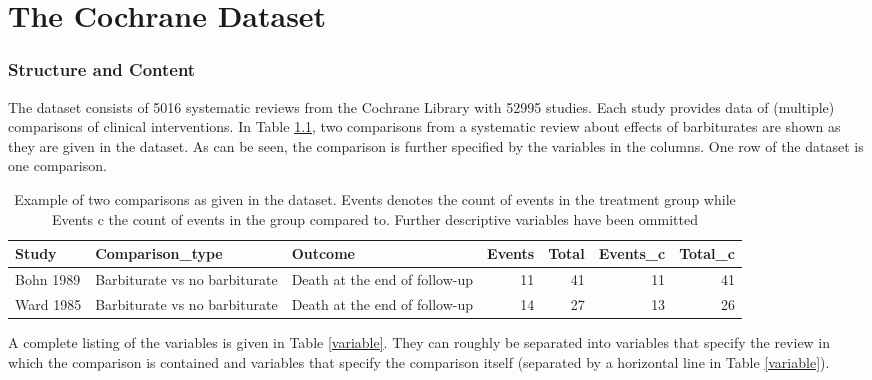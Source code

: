 \documentclass[11pt,a4paper,twoside]{book}\usepackage[]{graphicx}\usepackage[]{color}
\begin{document}













\chapter{The Cochrane Dataset} 

\subsection{Structure and Content}
The dataset consists of 5016 systematic reviews from the Cochrane Library with 52995 studies.
Each study provides data of (multiple) comparisons of clinical interventions. 
In Table \ref{barbiturate.row}, two comparisons from a systematic review about effects of barbiturates are shown as they are given in the dataset. As can be seen, the comparison is further specified by the variables in the columns. One row of the dataset is one comparison.

\begin{table}[ht]
\centering
\begingroup\scriptsize
\begin{tabular}{lllrrrr}
  \hline
Study & Comparison\_type & Outcome & Events & Total & Events\_c & Total\_c \\ 
  \hline
Bohn 1989 & Barbiturate vs no barbiturate & Death at the end of follow-up &  11 &  41 &  11 &  41 \\ 
  Ward 1985 & Barbiturate vs no barbiturate & Death at the end of follow-up &  14 &  27 &  13 &  26 \\ 
   \hline
\end{tabular}
\endgroup
\caption{Example of two comparisons as given in the dataset. Events denotes the count of events in the treatment group while Events c the count of events in the group compared to. Further descriptive variables have been ommitted} 
\label{barbiturate.row}
\end{table}


A complete listing of the variables is given in Table \ref{variable}. They can roughly be separated into variables that specify the review in which the comparison is contained and variables that specify the comparison itself (separated by a horizontal line in Table \ref{variable}).
\end{document}

